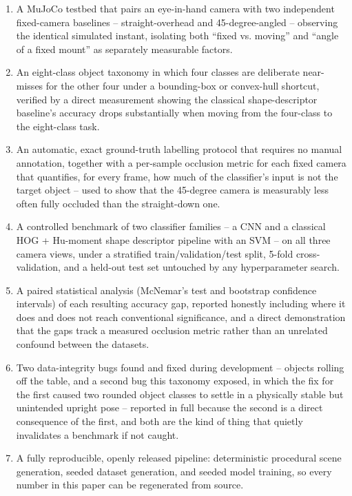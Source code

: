 \documentclass[conference]{IEEEtran}
\begin{document}
\begin{enumerate}

  \item A MuJoCo testbed that pairs an eye-in-hand camera with two independent fixed-camera baselines -- straight-overhead and 45-degree-angled -- observing the identical simulated instant, isolating both ``fixed vs. moving'' and ``angle of a fixed mount'' as separately measurable factors.

  \item An eight-class object taxonomy in which four classes are deliberate near-misses for the other four under a bounding-box or convex-hull shortcut, verified by a direct measurement showing the classical shape-descriptor baseline's accuracy drops substantially when moving from the four-class to the eight-class task.

  \item An automatic, exact ground-truth labelling protocol that requires no manual annotation, together with a per-sample occlusion metric for each fixed camera that quantifies, for every frame, how much of the classifier's input is not the target object -- used to show that the 45-degree camera is measurably less often fully occluded than the straight-down one.

  \item A controlled benchmark of two classifier families -- a CNN and a classical HOG + Hu-moment shape descriptor pipeline with an SVM -- on all three camera views, under a stratified train/validation/test split, 5-fold cross-validation, and a held-out test set untouched by any hyperparameter search.

  \item A paired statistical analysis (McNemar's test and bootstrap confidence intervals) of each resulting accuracy gap, reported honestly including where it does and does not reach conventional significance, and a direct demonstration that the gaps track a measured occlusion metric rather than an unrelated confound between the datasets.

  \item Two data-integrity bugs found and fixed during development -- objects rolling off the table, and a second bug this taxonomy exposed, in which the fix for the first caused two rounded object classes to settle in a physically stable but unintended upright pose -- reported in full because the second is a direct consequence of the first, and both are the kind of thing that quietly invalidates a benchmark if not caught.

  \item A fully reproducible, openly released pipeline: deterministic procedural scene generation, seeded dataset generation, and seeded model training, so every number in this paper can be regenerated from source.

\end{enumerate}
\end{document}
